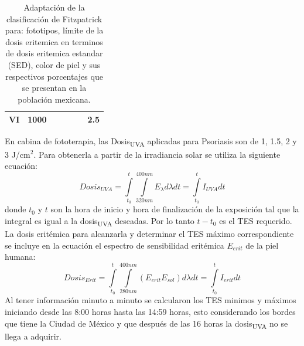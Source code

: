 \documentclass{article}
\begin{document}
\begin{multicols}{2}
\begin{center}
\begin{table}[H]
\begin{tabulary}{1.0\linewidth}{ccccccc}
        VI 	&1000 	&	&  &	&	&2.5	\\ \hline
    \end{tabulary}
    \caption{{Adaptación de la clasificación de Fitzpatrick para: fototipos, límite de la dosis eritemica en terminos de dosis eritemica estandar (SED), color de piel y sus respectivos porcentajes que se presentan en la población mexicana.{\label{fig:fototipo}}}}
    \end{table}
\end{center}
 \vspace{-0.5cm}
En cabina de fototerapia, las Dosis\textsubscript{UVA} aplicadas para Psoriasis son de 1, 1.5, 2 y 3 J/cm$^2$. 
Para obtenerla a partir de la irradiancia solar se utiliza la siguiente ecuación:
\begin{equation*}
    Dosis_{UVA}=\int\limits_{t_0}^t\int\limits_{320nm}^{400nm} E_{\lambda} d\lambda dt =\int\limits_{t_0}^{t}I_{UVA}dt
\end{equation*}
donde $t_0$ y $t$ son la hora de inicio y hora de finalización de la exposición tal que la integral es igual a la dosis\textsubscript{UVA} deseadas.
Por lo tanto $t-t_0$ es el TES requerido. La dosis eritémica para alcanzarla y determinar el TES máximo correspondiente se incluye en la ecuación el espectro de sensibilidad eritémica $E_{erit}$ de la piel humana:
\begin{equation*}
    Dosis_{Erit}=\int\limits_{t_0}^{t} \int\limits_{280nm}^{400nm} \left( E_{erit}E_{sol}\right)d\lambda dt = \int\limits_{t_0}^{t}I_{erit}dt
\end{equation*}
Al tener información minuto a minuto se calcularon los TES minimos y máximos iniciando desde las 8:00 horas hasta las 14:59 horas, esto considerando los bordes que tiene la Ciudad de México y que después de las 16 horas la dosis\textsubscript{UVA} no se llega a adquirir.\\

\end{multicols}
\end{document}
